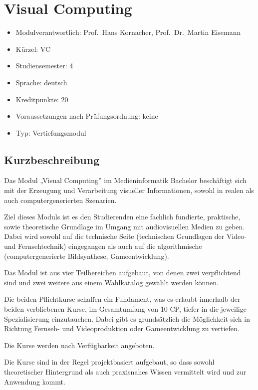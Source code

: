\chapter{Visual Computing}\label{visual-computing}

\begin{itemize}
\tightlist
\item
  Modulverantwortlich: Prof.~Hans Kornacher, Prof.~Dr.~Martin Eisemann
\item
  Kürzel: VC
\item
  Studiensemester: 4
\item
  Sprache: deutsch
\item
  Kreditpunkte: 20
\item
  Voraussetzungen nach Prüfungsordnung: keine
\item
  Typ: Vertiefungsmodul
\end{itemize}

\section*{Kurzbeschreibung}\label{kurzbeschreibung-4}

Das Modul „Visual Computing'' im Medieninformatik Bachelor beschäftigt
sich mit der Erzeugung und Verarbeitung visueller Informationen, sowohl
in realen als auch computergenerierten Szenarien.

Ziel dieses Moduls ist es den Studierenden eine fachlich fundierte,
praktische, sowie theoretische Grundlage im Umgang mit audiovisuellen
Medien zu geben. Dabei wird sowohl auf die technische Seite (technischen
Grundlagen der Video- und Fernsehtechnik) eingegangen als auch auf die
algorithmische (computergenerierte Bildsynthese, Gameentwicklung).

Das Modul ist aus vier Teilbereichen aufgebaut, von denen zwei
verpflichtend sind und zwei weitere aus einem Wahlkatalog gewählt werden
können.

Die beiden Pflichtkurse schaffen ein Fundament, was es erlaubt innerhalb
der beiden verbliebenen Kurse, im Gesamtumfang von 10 CP, tiefer in die
jeweilige Spezialisierung einzutauchen. Dabei gibt es grundsätzlich die
Möglichkeit sich in Richtung Fernseh- und Videoproduktion oder
Gameentwicklung zu vertiefen.

Die Kurse werden nach Verfügbarkeit angeboten.

Die Kurse sind in der Regel projektbasiert aufgebaut, so dass sowohl
theoretischer Hintergrund als auch praxisnahes Wissen vermittelt wird
und zur Anwendung kommt.

